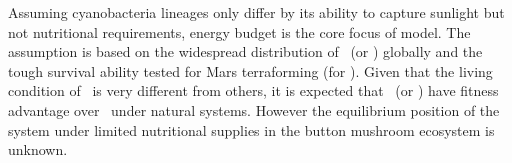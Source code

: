 \documentclass[../thesis.tex]{subfiles} %
\begin{document}
  Assuming cyanobacteria lineages only differ by its ability to capture sunlight but not nutritional requirements,\autocite{giraldo2014plant} energy budget is the core focus of model.  The assumption is based on the widespread distribution of \As\ (or \Ss) globally\autocite{joshi2018bacterial,sawa2017electricity} and the tough survival ability tested for Mars terraforming (for \Cs).\autocite{baque2013boss}  Given that the living condition of \Ct\ is very different from others,\autocite{nurnberg2018photochemistry} it is expected that \As\ (or \Ss) have fitness advantage over \Cs\ under natural systems.  However the equilibrium position of the system under limited nutritional supplies in the button mushroom ecosystem\autocite{joshi2018bacterial} is unknown.
\end{document}
